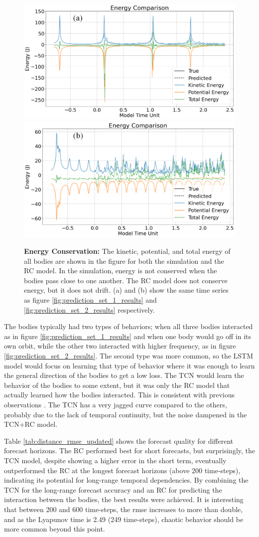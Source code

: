 \documentclass[%
 reprint,
 amsmath,amssymb,
 aps,
]{revtex4-2}
\begin{document}
\begin{figure}
    \centering
    \includegraphics[width=0.497\linewidth]{plot_1_Energy_Reservoir_marked.png}
    \includegraphics[width=0.497\linewidth]{plot_3_Energy_Reservoir_marked.png}
    \caption{\textbf{Energy Conservation:} The kinetic, potential, and total energy of all bodies are shown in the figure for both the simulation and the RC model. In the simulation, energy is not conserved when the bodies pass close to one another. The RC model does not conserve energy, but it does not drift. (a) and (b) show the same time series as figure \ref{fig:prediction_set_1_results} and \ref{fig:prediction_set_2_results} respectively.}
    \label{fig:energy}
\end{figure}

The bodies typically had two types of behaviors; when all three bodies interacted as in figure \ref{fig:prediction_set_1_results} and when one body would go off in its own orbit, while the other two interacted with higher frequency, as in figure \ref{fig:prediction_set_2_results}. The second type was more common, so the LSTM model would focus on learning that type of behavior where it was enough to learn the general direction of the bodies to get a low loss. The TCN would learn the behavior of the bodies to some extent, but it was only the RC model that actually learned how the bodies interacted. This is consistent with previous observations \cite{pathak2018model}. The TCN has a very jagged curve compared to the others, probably due to the lack of temporal continuity, but the noise dampened in the TCN+RC model.

Table \ref{tab:distance_rmse_updated} shows the forecast quality for different forecast horizons. The RC performed best for short forecasts, but surprisingly, the TCN model, despite showing a higher error in the short term, eventually outperformed the RC at the longest forecast horizons (above 200 time-steps), indicating its potential for long-range temporal dependencies. By combining the TCN for the long-range forecast accuracy and an RC for predicting the interaction between the bodies, the best results were achieved. It is interesting that between 200 and 600 time-steps, the rmse increases to more than double, and as the Lyapunov time is 2.49 (249 time-steps), chaotic behavior should be more common beyond this point.
\end{document}
